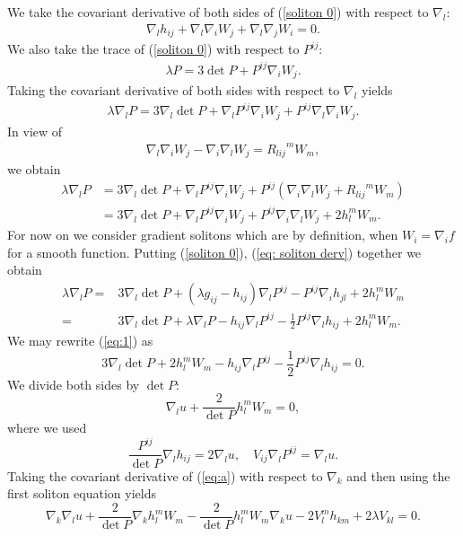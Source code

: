 \documentclass{amsart}
\theoremstyle{definition}
\theoremstyle{remark}
\numberwithin{equation}{section}
\begin{document}
We take the covariant derivative of both sides of (\ref{soliton 0}) with respect to $\nabla_l:$
\begin{align}\label{eq: soliton derv}
\nabla_lh_{ij}+\nabla_l\nabla_iW_j+\nabla_l\nabla_jW_i=0.
\end{align}
We also take the trace of (\ref{soliton 0}) with respect to $P^{ij}$:
\begin{align}\label{trace}
\lambda P=3\det P+P^{ij}\nabla_iW_j.
\end{align}
Taking the covariant derivative of both sides with respect to $\nabla_l$ yields
\begin{align*}
\lambda \nabla_l P=3\nabla_l\det P+\nabla_l P^{ij}\nabla_iW_j+P^{ij}\nabla_l\nabla_iW_j.
\end{align*}
In view of
\begin{align*}
\nabla_l\nabla_iW_j-\nabla_i\nabla_lW_j={R_{lij}}^mW_m,
\end{align*}
we obtain
\begin{align}\label{equ00}
\lambda \nabla_l P&=3\nabla_l\det P+\nabla_l P^{ij}\nabla_iW_j+P^{ij}(\nabla_i\nabla_lW_j+{R_{lij}}^mW_m)\\
&=3\nabla_l\det P+\nabla_l P^{ij}\nabla_iW_j+P^{ij}\nabla_i\nabla_lW_j+2h_l^mW_m.\nonumber
\end{align}
For now on  we consider gradient solitons which are by definition, when $W_i=\nabla_if$ for a smooth function.
Putting (\ref{soliton 0}), (\ref{eq: soliton derv}) together we obtain
\begin{align}\label{eq:1}
\lambda \nabla_l P
=&3\nabla_l\det P+(\lambda g_{ij}-h_{ij})\nabla_l P^{ij}-P^{ij}\nabla_ih_{jl}+2h_l^mW_m\\
=&3\nabla_l\det P+\lambda \nabla_l P-h_{ij}\nabla_l P^{ij}-\frac{1}{2}P^{ij}\nabla_lh_{ij}+2h_l^mW_m.\nonumber
\end{align}
We may rewrite (\ref{eq:1}) as
\[3\nabla_l\det P+2h_l^mW_m-h_{ij}\nabla_l P^{ij}-\frac{1}{2}P^{ij}\nabla_lh_{ij}=0.\]
We divide both sides by $\det P:$
\begin{equation}\label{eq:a}
\nabla_lu+\frac{2}{\det P}h_l^mW_m=0,
\end{equation}
where we used
\begin{equation}\label{eq0}
\frac{P^{ij}}{\det P}\nabla_lh_{ij}=2\nabla_lu,\quad V_{ij}\nabla_lP^{ij}=\nabla_lu.
\end{equation}
Taking the covariant derivative of (\ref{eq:a}) with respect to $\nabla_k$ and then using the first soliton equation yields
\begin{equation*}
\nabla_k\nabla_lu+\frac{2}{\det P}\nabla_kh_l^mW_m-\frac{2}{\det P}h_l^mW_m\nabla_ku-2V_l^mh_{km}+2\lambda V_{kl}=0.
\end{equation*}
\end{document}
